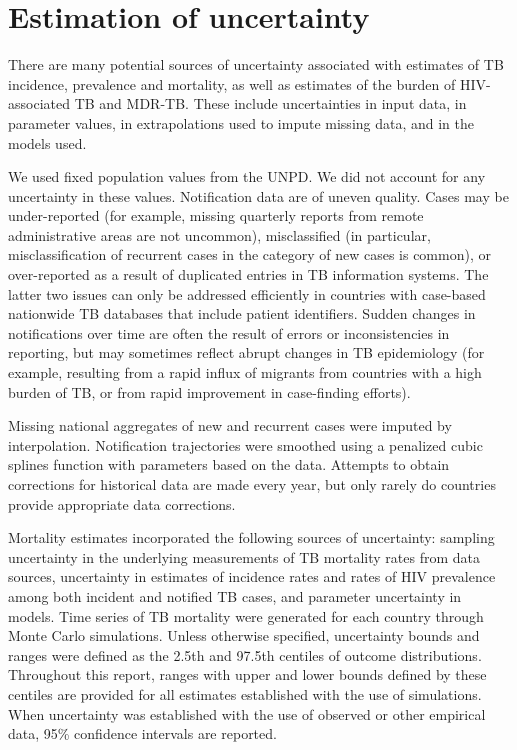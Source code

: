\section{Estimation of uncertainty}

There are many potential sources of uncertainty associated with estimates of TB incidence, prevalence and mortality, as well as estimates of the burden of HIV-associated TB and MDR-TB. These include uncertainties in input data, in parameter values, in extrapolations used to impute missing data, and in the models used. 

We used fixed population values from the UNPD. We did not account for any uncertainty in these values.  
Notification data are of uneven quality. Cases may be under-reported (for example, missing quarterly reports from remote administrative areas are not uncommon), misclassified (in particular, misclassification of recurrent cases in the category of new cases is common), or over-reported as a result of duplicated entries in TB information systems. The latter two issues can only be addressed efficiently in countries with case-based nationwide TB databases that include patient identifiers. Sudden changes in notifications over time are often the result of errors or inconsistencies in reporting, but may sometimes reflect abrupt changes in TB epidemiology (for example, resulting from a rapid influx of migrants from countries with a high burden of TB, or from rapid improvement in case-finding efforts). 

Missing national aggregates of new and recurrent cases were imputed by interpolation. Notification trajectories were smoothed using a penalized cubic splines function with parameters based on the data. Attempts to obtain corrections for historical data are made every year, but only rarely do countries provide appropriate data corrections. 

Mortality estimates incorporated the following sources of uncertainty: sampling uncertainty in the underlying measurements of TB mortality rates from data sources, uncertainty in estimates of incidence rates and rates of HIV prevalence among both incident and notified TB cases, and parameter uncertainty in models. Time series of TB mortality were generated for each country through Monte Carlo simulations. 
Unless otherwise specified, uncertainty bounds and ranges were defined as the 2.5th and 97.5th centiles of outcome distributions. Throughout this report, ranges with upper and lower bounds defined by these centiles are provided for all estimates established with the use of simulations. When uncertainty was established with the use of observed or other empirical data, 95\% confidence intervals are reported.
 

